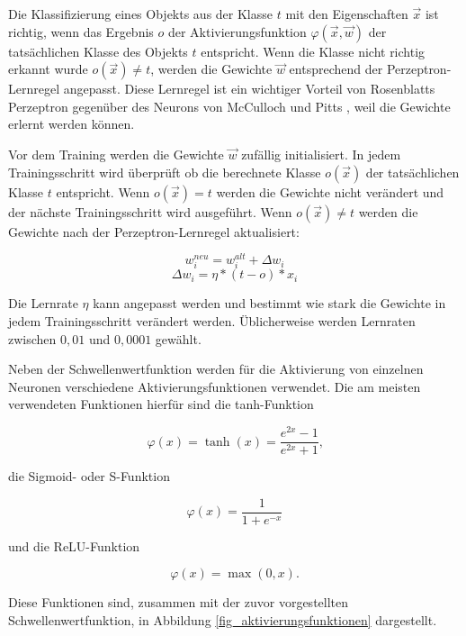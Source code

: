 Die Klassifizierung eines Objekts aus der Klasse $t$ mit den Eigenschaften $\vec{x}$ ist richtig, wenn das Ergebnis $o$ der Aktivierungsfunktion $\varphi(\vec{x},\vec{w})$ der tatsächlichen Klasse des Objekts $t$ entspricht. Wenn die Klasse nicht richtig erkannt wurde $o(\vec{x}) \neq t$, werden die Gewichte $\vec{w}$ entsprechend der Perzeptron-Lernregel angepasst. Diese Lernregel ist ein wichtiger Vorteil von Rosenblatts Perzeptron \cite{rosenblatt1958perceptron} gegenüber des Neurons von McCulloch und Pitts \cite{mcculloch1943logical}, weil die Gewichte erlernt werden können.

Vor dem Training werden die Gewichte $\vec{w}$ zufällig initialisiert. In jedem Trainingsschritt wird überprüft ob die berechnete Klasse $o(\vec{x})$ der tatsächlichen Klasse $t$ entspricht. Wenn $o(\vec{x}) = t$ werden die Gewichte nicht verändert und der nächste Trainingsschritt wird ausgeführt. Wenn $o(\vec{x}) \neq t$ werden die Gewichte nach der Perzeptron-Lernregel aktualisiert:

\begin{equation}
w^{neu}_i = w^{alt}_i + \Delta w_i
\end{equation}
\begin{equation}
\Delta w_i = \eta*(t-o)*x_i
\end{equation}

Die Lernrate $\eta$ kann angepasst werden und bestimmt wie stark die Gewichte in jedem Trainingsschritt verändert werden. Üblicherweise werden Lernraten zwischen $0,01$ und $0,0001$ gewählt.

Neben der Schwellenwertfunktion werden für die Aktivierung von einzelnen Neuronen verschiedene Aktivierungsfunktionen verwendet. Die am meisten verwendeten Funktionen hierfür sind die \ac{tanh}-Funktion

\begin{equation}
\varphi(x) = \tanh(x) = \frac{e^{2x}-1}{e^{2x}+1} \text{,}
\end{equation}

\noindent die Sigmoid- oder S-Funktion

\begin{equation}
\varphi(x) = \frac{1}{1+e^{-x}}
\end{equation}

\noindent und die \ac{ReLU}-Funktion 

\begin{equation}
\varphi(x) = \max{(0, x)}.
\end{equation}

\noindent Diese Funktionen sind, zusammen mit der zuvor vorgestellten Schwellenwertfunktion, in Abbildung \ref{fig_aktivierungsfunktionen} dargestellt.

